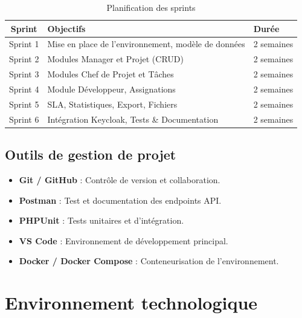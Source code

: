 \begin{table}[H]
\centering
\caption{Planification des sprints}
\begin{tabular}{|c|l|l|}
\hline
\rowcolor{emsiRed!15}
\textbf{Sprint} & \textbf{Objectifs} & \textbf{Dur\'{e}e} \\
\hline
Sprint 1 & Mise en place de l'environnement, mod\`{e}le de donn\'{e}es & 2 semaines \\
\hline
Sprint 2 & Modules Manager et Projet (CRUD) & 2 semaines \\
\hline
Sprint 3 & Modules Chef de Projet et T\^{a}ches & 2 semaines \\
\hline
Sprint 4 & Module D\'{e}veloppeur, Assignations & 2 semaines \\
\hline
Sprint 5 & SLA, Statistiques, Export, Fichiers & 2 semaines \\
\hline
Sprint 6 & Int\'{e}gration Keycloak, Tests \& Documentation & 2 semaines \\
\hline
\end{tabular}
\end{table}

\subsection{Outils de gestion de projet}

\begin{itemize}[leftmargin=*, label=\textcolor{emsiRed}{}]
  \item \textbf{Git / GitHub} : Contr\^{o}le de version et collaboration.
  \item \textbf{Postman} : Test et documentation des endpoints API.
  \item \textbf{PHPUnit} : Tests unitaires et d'int\'{e}gration.
  \item \textbf{VS Code} : Environnement de d\'{e}veloppement principal.
  \item \textbf{Docker / Docker Compose} : Conteneurisation de l'environnement.
\end{itemize}

\section{Environnement technologique}

